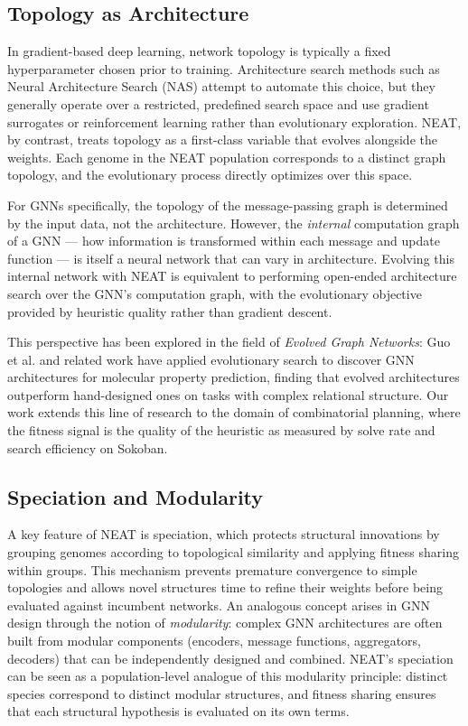 \subsection{Topology as Architecture}

In gradient-based deep learning, network topology is typically a fixed hyperparameter chosen prior to training. Architecture search methods such as Neural Architecture Search (NAS) \cite{zoph2017neural} attempt to automate this choice, but they generally operate over a restricted, predefined search space and use gradient surrogates or reinforcement learning rather than evolutionary exploration. NEAT, by contrast, treats topology as a first-class variable that evolves alongside the weights. Each genome in the NEAT population corresponds to a distinct graph topology, and the evolutionary process directly optimizes over this space.

For GNNs specifically, the topology of the message-passing graph is determined by the input data, not the architecture. However, the \textit{internal} computation graph of a GNN --- how information is transformed within each message and update function --- is itself a neural network that can vary in architecture. Evolving this internal network with NEAT is equivalent to performing open-ended architecture search over the GNN's computation graph, with the evolutionary objective provided by heuristic quality rather than gradient descent.

This perspective has been explored in the field of \textit{Evolved Graph Networks}: Guo et al. \cite{guo2021evolving} and related work have applied evolutionary search to discover GNN architectures for molecular property prediction, finding that evolved architectures outperform hand-designed ones on tasks with complex relational structure. Our work extends this line of research to the domain of combinatorial planning, where the fitness signal is the quality of the heuristic as measured by solve rate and search efficiency on Sokoban.

\subsection{Speciation and Modularity}

A key feature of NEAT is speciation, which protects structural innovations by grouping genomes according to topological similarity and applying fitness sharing within groups. This mechanism prevents premature convergence to simple topologies and allows novel structures time to refine their weights before being evaluated against incumbent networks. An analogous concept arises in GNN design through the notion of \textit{modularity}: complex GNN architectures are often built from modular components (encoders, message functions, aggregators, decoders) that can be independently designed and combined. NEAT's speciation can be seen as a population-level analogue of this modularity principle: distinct species correspond to distinct modular structures, and fitness sharing ensures that each structural hypothesis is evaluated on its own terms.

